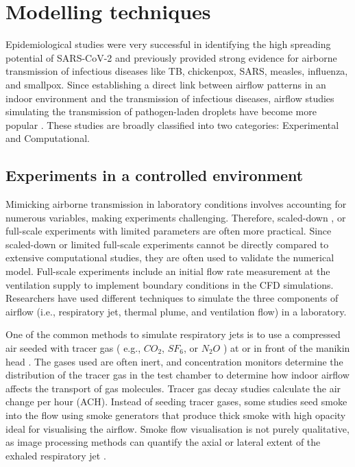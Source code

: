 \documentclass[preprint,12pt]{elsarticle}
\begin{document}
\section{Modelling techniques}

Epidemiological studies were very successful in identifying the high spreading potential of SARS-CoV-2 \cite{rothan2020epidemiology} and previously provided strong evidence for airborne transmission of infectious diseases like TB, chickenpox, SARS, measles, influenza, and smallpox. Since establishing a direct link between airflow patterns in an indoor environment and the transmission of infectious diseases, airflow studies simulating the transmission of pathogen-laden droplets have become more popular \cite{li2007role}. These studies are broadly classified into two categories: Experimental and Computational. 

\subsection{Experiments in a controlled environment}

Mimicking airborne transmission in laboratory conditions involves accounting for numerous variables, making experiments challenging. Therefore, scaled-down \cite{poussou2010flow}, or full-scale experiments with limited parameters \cite{luo2022role} are often more practical. Since scaled-down or limited full-scale experiments cannot be directly compared to extensive computational studies, they are often used to validate the numerical model. Full-scale experiments include an initial flow rate measurement at the ventilation supply to implement boundary conditions in the CFD simulations. Researchers have used different techniques to simulate the three components of airflow (i.e., respiratory jet, thermal plume, and ventilation flow) in a laboratory.

One of the common methods to simulate respiratory jets is to use a compressed air seeded with tracer gas ( e.g., $CO_2$, $SF_6$, or $N_2O$ ) at or in front of the manikin head \cite{qian2008dispersion,ren2022practical,lu2022ventilation}. The gases used are often inert, and concentration monitors determine the distribution of the tracer gas in the test chamber to determine how indoor airflow affects the transport of gas molecules. Tracer gas decay studies calculate the air change per hour (ACH). Instead of seeding tracer gases, some studies seed smoke into the flow using smoke generators that produce thick smoke with high opacity ideal for visualising the airflow. Smoke flow visualisation is not purely qualitative, as image processing methods can quantify the axial or lateral extent of the exhaled respiratory jet \cite{saarinen2015large,pan2022boundary}.
\end{document}
